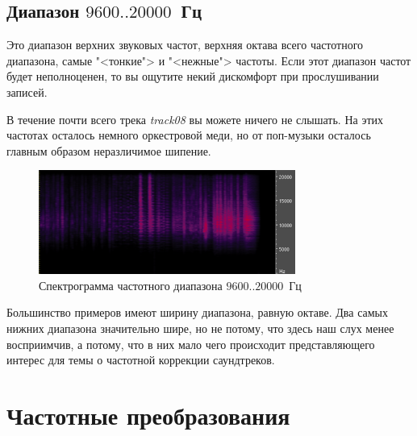 \documentclass[oneside, final, 14pt]{extreport}
\begin{document}
\subsection{Диапазон $9600..20000$~Гц}
Это диапазон верхних звуковых частот, верхняя октава всего частотного диапазона, самые "<тонкие"> и "<нежные"> частоты. Если этот диапазон частот будет неполноценен, то вы ощутите некий дискомфорт при прослушивании записей.

В течение почти всего трека \emph{track08} вы можете ничего не слышать. На этих частотах осталось немного оркестровой меди, но от поп-музыки осталось главным образом неразличимое шипение.

\begin{figure}[h]
  \centering
  \includegraphics[width=0.75\textwidth]{pic-specter-08}
  \caption{Спектрограмма частотного диапазона $9600..20000$~Гц}
  \label{pic-specter-08}
\end{figure}

Большинство примеров имеют ширину диапазона, равную октаве. Два самых нижних диапазона значительно шире, но не потому, что здесь наш слух менее восприимчив, а потому, что в них мало чего происходит представляющего интерес для темы о частотной коррекции саундтреков.

\section{Частотные преобразования}
\end{document}
